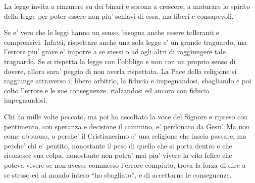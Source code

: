 La legge invita a rimanere su dei binari e sprona a crescere, a maturare lo spirito della legge per poter essere non piu' schiavi di essa, ma liberi e consapevoli.

Se e' vero che le leggi hanno un senso, bisogna anche essere tolleranti e comprensivi. Infatti, rispettare anche una sola legge e' un grande traguardo, ma l'errore piu' grave e' imporre a se stessi o ad agli altri di raggiungere tale traguardo. Se si rispetta la legge con l'obbligo e non con un proprio senso di dovere, allora sara' peggio di non averla rispettata. La Pace della religione si raggiunge attraverso il libero arbitrio, la fiducia e impegnandosi, sbagliando e poi colto l'errore e le sue conseguenze, rialzandosi ed ancora con fiducia impegnandosi.

Chi ha mille volte peccato, ma poi ha ascoltato la voce del Signore e ripreso con pentimento, con speranza e decisione il cammino, e' perdonato da Gesu'. Ma non come abbuono, o perche' il Cristianesimo e' una religione che lascia passare, ma perche' chi e' pentito, nonostante il peso di quello che si porta dentro e che riconosce sua colpa, nonostante non potra' mai piu' vivere la vita felice che poteva vivere se non avesse commesso l'errore compiuto, trova la forza di dire a se stesso ed al mondo intero ``ho sbagliato'', e di accettarne le conseguenze. 

